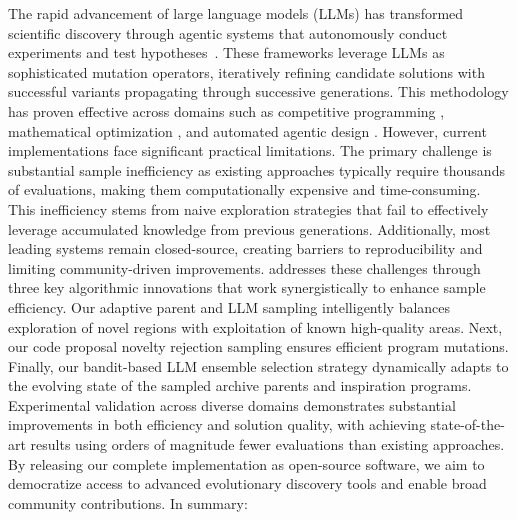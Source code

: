 The rapid advancement of large language models (LLMs) has transformed scientific discovery through agentic systems that autonomously conduct experiments and test hypotheses~\citep{lu2024ai, yamada2025ai, novikov2025alphaevolve, zhang2025darwin}. These frameworks leverage LLMs as sophisticated mutation operators, iteratively refining candidate solutions with successful variants propagating through successive generations. This methodology has proven effective across domains such as competitive programming \citep{li2022competition}, mathematical optimization \citep{romera2024mathematical}, and automated agentic design \citep{hu2024automated}.
%
However, current implementations face significant practical limitations. The primary challenge is substantial sample inefficiency as existing approaches typically require thousands of evaluations, making them computationally expensive and time-consuming. This inefficiency stems from naive exploration strategies that fail to effectively leverage accumulated knowledge from previous generations. Additionally, most leading systems remain closed-source, creating barriers to reproducibility and limiting community-driven improvements.
%
\ouralgo addresses these challenges through three key algorithmic innovations that work synergistically to enhance sample efficiency. Our adaptive parent and LLM sampling intelligently balances exploration of novel regions with exploitation of known high-quality areas. Next, our code proposal novelty rejection sampling ensures efficient program mutations. Finally, our bandit-based LLM ensemble selection strategy dynamically adapts to the evolving state of the sampled archive parents and inspiration programs.
%
Experimental validation across diverse domains demonstrates substantial improvements in both efficiency and solution quality, with \ouralgo achieving state-of-the-art results using orders of magnitude fewer evaluations than existing approaches. By releasing our complete implementation as open-source software, we aim to democratize access to advanced evolutionary discovery tools and enable broad community contributions. In summary:

